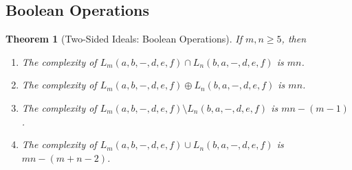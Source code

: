 \documentclass[final]{dmtcs-episciences}
\renewcommand{\ge}{\geqslant}
\newcommand{\be}{\begin{enumerate}}
\newcommand{\ee}{\end{enumerate}}
\newtheorem{theorem}{Theorem}
\theoremstyle{definition}
\theoremstyle{remark}
\begin{document}
\subsection{Boolean Operations}
\label{ssec:boolean_2sided}
\begin{theorem}[Two-Sided Ideals: Boolean Operations]
\label{thm:2Bool}
If $m,n\ge 5$, then
\be
\item
The complexity of $L_m(a,b,-,d,e,f) \cap L_n(b,a,-,d,e,f)$ is $mn$.
\item
The complexity of $L_m(a,b,-,d,e,f) \oplus L_n(b,a,-,d,e,f)$ is $mn$.
\item
The complexity of $L_m(a,b,-,d,e,f) \setminus L_n(b,a,-,d,e,f)$ is $mn-(m-1)$.
\item
The complexity of $L_m(a,b,-,d,e,f) \cup L_n(b,a,-,d,e,f)$ is $mn-(m+n-2)$.
\ee
\end{theorem}
\end{document}
